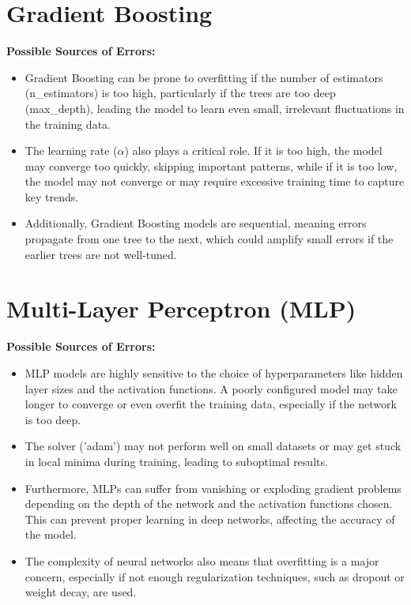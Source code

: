 \documentclass[12pt]{report}
\begin{document}
\section{Gradient Boosting}


\textbf{Possible Sources of Errors:} 
\begin{itemize}
    \item Gradient Boosting can be prone to overfitting if the number of estimators (n\_estimators) is too high, particularly if the trees are too deep (max\_depth), leading the model to learn even small, irrelevant fluctuations in the training data.
    \item The learning rate (\( \alpha \)) also plays a critical role. If it is too high, the model may converge too quickly, skipping important patterns, while if it is too low, the model may not converge or may require excessive training time to capture key trends.
    \item Additionally, Gradient Boosting models are sequential, meaning errors propagate from one tree to the next, which could amplify small errors if the earlier trees are not well-tuned.
\end{itemize}

\section{Multi-Layer Perceptron (MLP)}


\textbf{Possible Sources of Errors:} 
\begin{itemize}
    \item MLP models are highly sensitive to the choice of hyperparameters like hidden layer sizes and the activation functions. A poorly configured model may take longer to converge or even overfit the training data, especially if the network is too deep.
    \item The solver ('adam') may not perform well on small datasets or may get stuck in local minima during training, leading to suboptimal results.
    \item Furthermore, MLPs can suffer from vanishing or exploding gradient problems depending on the depth of the network and the activation functions chosen. This can prevent proper learning in deep networks, affecting the accuracy of the model.
    \item The complexity of neural networks also means that overfitting is a major concern, especially if not enough regularization techniques, such as dropout or weight decay, are used.
\end{itemize}
\end{document}
